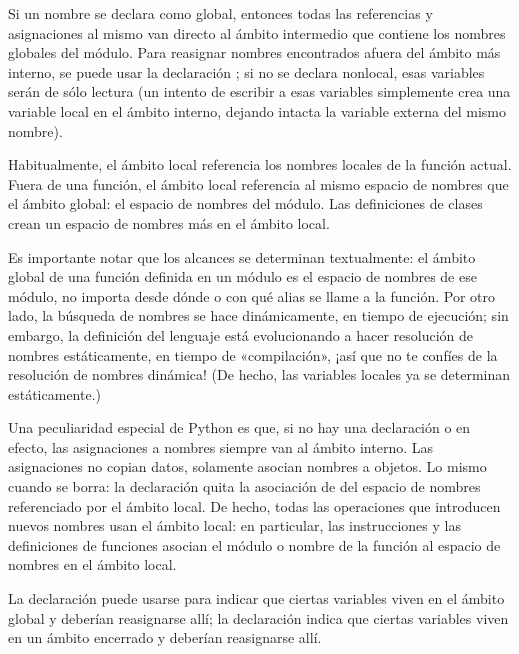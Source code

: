\documentclass[a5paper,10pt,spanish]{sphinxmanual}
\begin{document}
\sphinxAtStartPar
Si un nombre se declara como global, entonces todas las referencias y asignaciones al mismo van directo al ámbito intermedio que contiene los nombres globales del módulo.  Para reasignar nombres encontrados afuera del ámbito más interno, se puede usar la declaración ; si no se declara nonlocal, esas variables serán de sólo lectura (un intento de escribir a esas variables simplemente crea una  variable local en el ámbito interno, dejando intacta la variable externa del mismo nombre).

\sphinxAtStartPar
Habitualmente, el ámbito local referencia los nombres locales de la función actual.  Fuera de una función, el ámbito local referencia al mismo espacio de nombres que el ámbito global: el espacio de nombres del módulo. Las definiciones de clases crean un espacio de nombres más en el ámbito local.

\sphinxAtStartPar
Es importante notar que los alcances se determinan textualmente: el ámbito global de una función definida en un módulo es el espacio de nombres de ese módulo, no importa desde dónde o con qué alias se llame a la función.  Por otro lado, la búsqueda de nombres se hace dinámicamente, en tiempo de ejecución; sin embargo, la definición del lenguaje está evolucionando a hacer resolución de nombres estáticamente, en tiempo de «compilación», ¡así que no te confíes de la resolución de nombres dinámica! (De hecho, las variables locales ya se determinan estáticamente.)

\sphinxAtStartPar
Una peculiaridad especial de Python es que, si no hay una declaración  o  en efecto, las asignaciones a nombres siempre van al ámbito interno.  Las asignaciones no copian datos, solamente asocian nombres a objetos.  Lo mismo cuando se borra: la declaración  quita la asociación de  del espacio de nombres referenciado por el ámbito local.  De hecho, todas las operaciones que introducen nuevos nombres usan el ámbito local: en particular, las instrucciones  y las definiciones de funciones asocian el módulo o nombre de la función al espacio de nombres en el ámbito local.

\sphinxAtStartPar
La declaración  puede usarse para indicar que ciertas variables viven en el ámbito global y deberían reasignarse allí; la declaración  indica que ciertas variables viven en un ámbito encerrado y deberían reasignarse allí.
\end{document}
